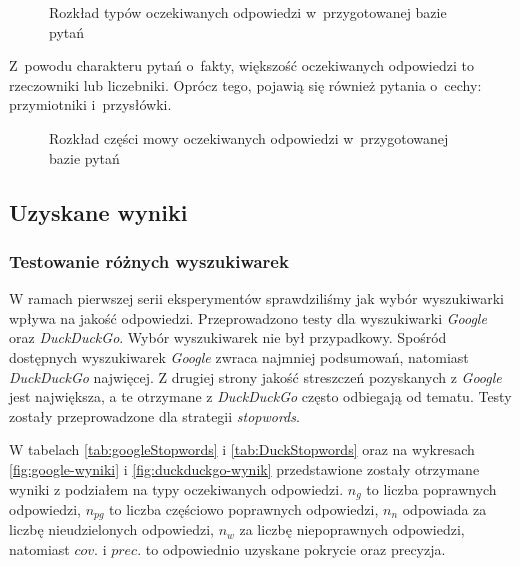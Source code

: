 \begin{figure}[h!]
    \label{fig:rozklad-typow-odpowiedzi}  
    \caption{Rozkład typów oczekiwanych odpowiedzi w~przygotowanej bazie pytań}
\end{figure}

Z~powodu charakteru pytań o~fakty, większość oczekiwanych odpowiedzi to rzeczowniki lub liczebniki. Oprócz tego, pojawią się również pytania o~cechy: przymiotniki i~przysłówki.

\begin{figure}[h!]
    \label{fig:rozklad-typow-odpowiedzi2}  
    \caption{Rozkład części mowy oczekiwanych odpowiedzi w~przygotowanej bazie pytań}
\end{figure}

\subsection{Uzyskane wyniki}

\subsubsection{Testowanie różnych wyszukiwarek}
W ramach pierwszej serii eksperymentów sprawdziliśmy jak wybór wyszukiwarki wpływa na jakość odpowiedzi. Przeprowadzono testy dla wyszukiwarki \textit{Google} oraz \textit{DuckDuckGo}. Wybór wyszukiwarek nie był przypadkowy. Spośród dostępnych wyszukiwarek \textit{Google} zwraca najmniej podsumowań, natomiast \textit{DuckDuckGo} najwięcej. Z drugiej strony jakość streszczeń pozyskanych z \textit{Google} jest największa, a te otrzymane z \textit{DuckDuckGo} często odbiegają od tematu. Testy zostały przeprowadzone dla strategii \textit{stopwords}.

W tabelach \ref{tab:googleStopwords} i \ref{tab:DuckStopwords} oraz na wykresach \ref{fig:google-wyniki} i \ref{fig:duckduckgo-wynik} przedstawione zostały otrzymane wyniki z podziałem na typy oczekiwanych odpowiedzi. $n_g$ to liczba poprawnych odpowiedzi, $n_{pg}$ to liczba częściowo poprawnych odpowiedzi, $n_n$ odpowiada za liczbę nieudzielonych odpowiedzi, $n_w$ za liczbę niepoprawnych odpowiedzi, natomiast $cov.$ i $prec.$ to odpowiednio uzyskane pokrycie oraz precyzja.

